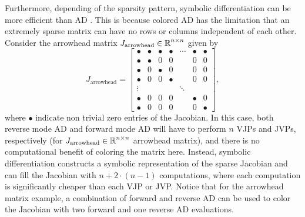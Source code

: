 Furthermore, depending  of the sparsity pattern, symbolic differentiation can be more efficient than AD \cite{Lantoine_Russell_Dargent_2012}.
This is because colored AD has the limitation that an extremely sparse matrix can have no rows or columns independent of each other. 
Consider the arrowhead matrix $J_{\text{arrowhead}} \in \operatorname{\mathbb{R}}^{n \times n}$ given by
\begin{equation}
    J_{\text{arrowhead}} = \begin{bmatrix}
        \bullet & \bullet & \bullet & \bullet & \cdots & \bullet  & \bullet   \\
        \bullet & \bullet & 0  &  0    &   & 0        & 0        \\
        \bullet & 0 & \bullet & 0 & & 0        & 0        \\
        \bullet & 0 & 0 & \bullet & & 0 & 0 \\
        \vdots & & & & \ddots & &  \\
        \bullet & 0 & 0 & 0   &   & \bullet   & 0        \\
        \bullet & 0 & 0        & 0    &    & 0        & \bullet
    \end{bmatrix},
\end{equation}
where $\bullet$ indicate non trivial zero entries of the Jacobian.
In this case, both reverse mode AD and forward mode AD will have to perform $n$ VJPs and JVPs, respectively (for $J_{\text{arrowhead}} \in \operatorname{\mathbb{R}}^{n \times n}$ arrowhead matrix), and there is no computational benefit of coloring the matrix here. 
Instead, symbolic differentiation constructs a symbolic representation of the sparse Jacobian and can fill the Jacobian with $n + 2 \cdot (n-1)$ computations, where each computation is significantly cheaper than each VJP or JVP. 
Notice that for the arrowhead matrix example, a combination of forward and reverse AD can be used to color the Jacobian with two forward and one reverse AD evaluations. 

